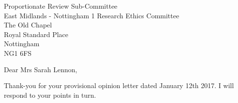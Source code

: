 \documentclass[imperial,letterpaper,pagesize,UScommercial9]{scrlttr2}
\begin{document}
\begin{letter}{    
    Proportionate Review Sub-Committee \\        
    East Midlands - Nottingham 1 Research Ethics Committee \\
    The Old Chapel \\
    Royal Standard Place \\
    Nottingham \\
    NG1 6FS} 



\opening{Dear Mrs Sarah Lennon,}

Thank-you for your provisional opinion letter dated January 12th 2017. I will respond to your points in turn.


\end{letter}
\end{document}
